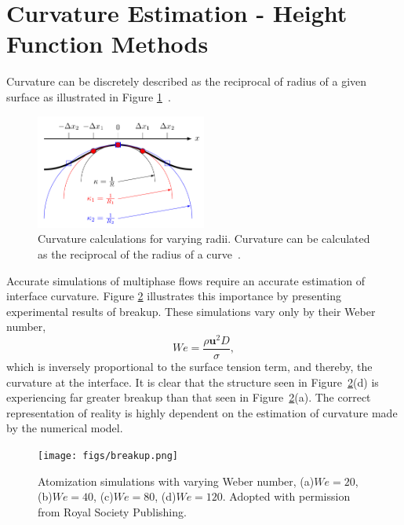\section{Curvature Estimation - Height Function Methods}
Curvature can be discretely described as the reciprocal of radius of a given surface as illustrated in Figure \ref{fig:curv}~\cite{Owkes2018}. 
 \begin{figure}[htbp]
	\centering
	\includegraphics[width=0.5\textwidth]{figs/curv}
	\caption{Curvature calculations for varying radii. Curvature can be calculated as the reciprocal of the radius of a curve~\cite{Owkes2018}.}
	\label{fig:curv}
\end{figure}
Accurate simulations of multiphase flows require an accurate estimation of interface curvature. Figure \ref{fig:surf} illustrates this importance by presenting experimental results of breakup. These simulations vary only by their Weber number,
\begin{equation}
We= \frac{\rho \bm{u}^2 D}{\sigma},
\end{equation}
 which is inversely proportional to the surface tension term, and thereby, the curvature at the interface. It is clear that the structure seen in Figure~\ref{fig:surf}(d) is experiencing far greater breakup than that seen in Figure~\ref{fig:surf}(a). The correct representation of reality is highly dependent on the estimation of curvature made by the numerical model. 
 \begin{figure}[htbp]
	\centering
	\texttt{[image: figs/breakup.png]}
	\caption{Atomization simulations with varying Weber number, (a)$We=20$, (b)$We=40$, (c)$We=80$, (d)$We=120$. Adopted with permission from Royal Society Publishing.}
	\label{fig:surf}
\end{figure}

